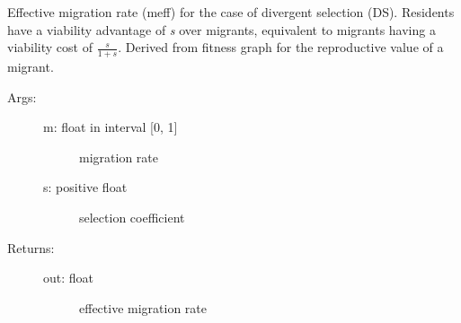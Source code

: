 \documentclass[letterpaper,10pt,english]{sphinxmanual}
\begin{document}
\begin{fulllineitems}
\label{index:wspec.analytical.meff_DS}
Effective migration rate (meff) for the case of divergent selection 
(DS). Residents have a viability advantage of \emph{s} over migrants, 
equivalent to migrants having a viability cost of $\frac{s}{1+s}$.
Derived from fitness graph for the reproductive value of a migrant.
\begin{description}
\item[{Args:}] \leavevmode\begin{description}
\item[{m: float in interval {[}0, 1{]}}] \leavevmode
migration rate

\item[{s: positive float}] \leavevmode
selection coefficient

\end{description}

\item[{Returns:}] \leavevmode\begin{description}
\item[{out: float}] \leavevmode
effective migration rate

\end{description}

\end{description}

\end{fulllineitems}

\end{document}
